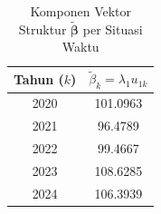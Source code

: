 \begin{table}[H]
\centering
\small
\caption{Komponen Vektor Struktur $\tilde{\boldsymbol{\beta}}$ per Situasi Waktu} \label{tab:appbeta_vec}
\begin{tabular}{|c|c|}
\hline
\textbf{Tahun ($k$)} & \textbf{$\tilde{\beta}_k = \lambda_1 u_{1k}$} \\
\hline
2020 & 101.0963 \\
2021 & 96.4789 \\
2022 & 99.4667 \\
2023 & 108.6285 \\
2024 & 106.3939 \\
\hline
\end{tabular}
\end{table}